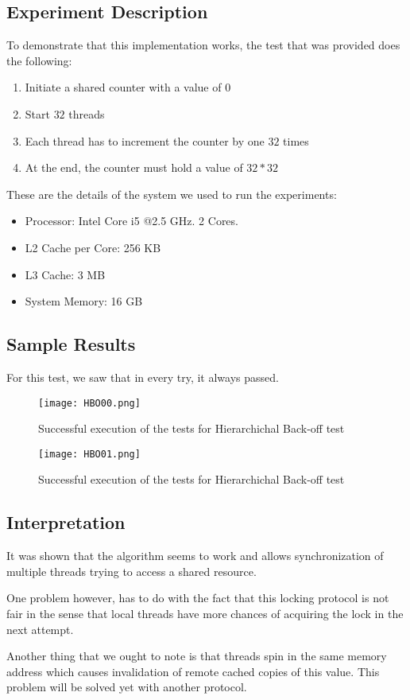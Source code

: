 \subsection{Experiment Description}
\par
To demonstrate that this implementation works, the test that was provided does the following:
\begin{enumerate}
\item Initiate a shared counter with a value of $0$
\item Start $32$ threads
\item Each thread has to increment the counter by one $32$ times
\item At the end, the counter must hold a value of $32*32$
\end{enumerate}
\par
These are the details of the system we used to run the experiments:
\begin{itemize}
\item Processor: Intel Core i5 @2.5 GHz. 2 Cores.
\item L2 Cache per Core: 256 KB
\item L3 Cache: 3 MB
\item System Memory: 16 GB
\end{itemize}
\subsection{Sample Results}
\par
For this test, we saw that in every try, it always passed.
\par
\begin{figure}[h]
  \centering
  \texttt{[image: HBO00.png]}
  \caption{Successful execution of the tests for Hierarchichal Back-off test}
  \label{fig:HBO00}
\end{figure}
\par
\begin{figure}[h]
  \centering
  \texttt{[image: HBO01.png]}
  \caption{Successful execution of the tests  for Hierarchichal Back-off test}
  \label{fig:HBO01}
\end{figure}
\par
\subsection{Interpretation}
It was shown that the algorithm seems to work and allows synchronization of multiple threads trying to access a shared resource.
\par
One problem however, has to do with the fact that this locking protocol is not fair in the sense that local threads have more chances of acquiring the lock in the next attempt. 
\par
Another thing that we ought to note is that threads spin in the same memory address which causes invalidation of remote cached copies of this value. This problem will be solved yet with another protocol.
